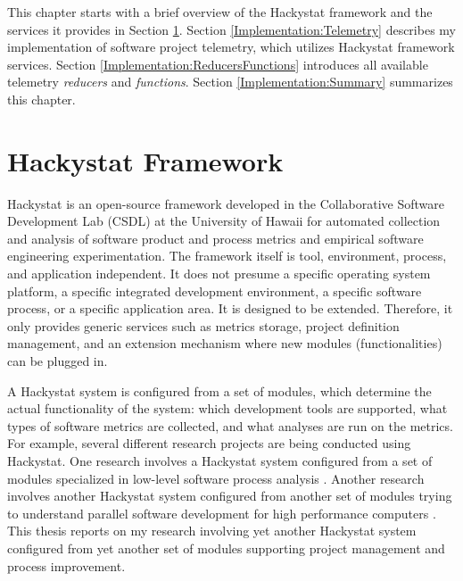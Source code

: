 This chapter starts with a brief overview of the Hackystat framework and the services it provides in Section \ref{Implementation:Hackystat}. 
Section \ref{Implementation:Telemetry} describes my implementation of software project telemetry, which utilizes Hackystat framework services.
Section \ref{Implementation:ReducersFunctions} introduces all available telemetry \textit{reducers} and \textit{functions}.
Section \ref{Implementation:Summary} summarizes this chapter.








\section{Hackystat Framework} \label{Implementation:Hackystat}

Hackystat is an open-source framework developed in the Collaborative Software Development Lab (CSDL) at the University of Hawaii for automated collection and analysis of software product and process metrics and empirical software engineering experimentation. 
The framework itself is tool, environment, process, and application independent. It does not presume a specific operating system platform, a specific integrated development environment, a specific software process, or a specific application area. It is designed to be extended. Therefore, it only provides generic services such as metrics storage, project definition management, and an extension mechanism where new modules (functionalities) can be plugged in.

A Hackystat system is configured from a set of modules, which determine the actual functionality of the system: which development tools are supported, what types of software metrics are collected, and what analyses are run on the metrics. For example, several different research projects are being conducted using Hackystat. One research involves a Hackystat system configured from a set of modules specialized in low-level software process analysis \cite{Kou:2006}. Another research involves another Hackystat system configured from another set of modules trying to understand parallel software development for high performance computers \cite{Johnson:2005}. This thesis reports on my research involving yet another Hackystat system configured from yet another set of modules supporting project management and process improvement.




